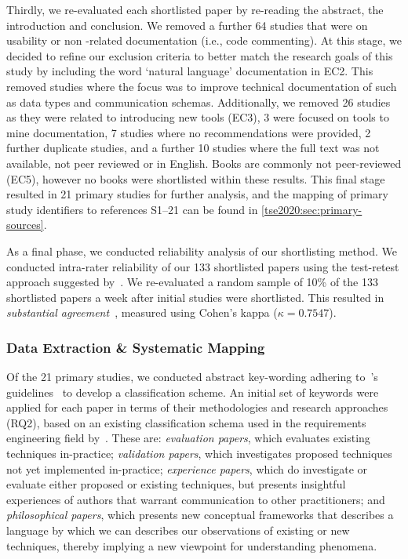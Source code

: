 Thirdly, we re-evaluated each shortlisted paper by re-reading the abstract, the introduction and conclusion. We removed a further 64 studies that were on  usability or non -related  documentation (i.e., code commenting). At this stage, we decided to refine our exclusion criteria to better match the research goals of this study by including the word `natural language' documentation in EC2. This removed studies where the focus was to improve technical documentation of  such as data types and communication schemas. Additionally, we removed 26 studies as they were related to introducing new tools (EC3), 3 were focused on tools to mine  documentation, 7 studies where no recommendations were provided, 2 further duplicate studies, and a further 10 studies where the full text was not available, not peer reviewed or in English. Books are commonly not peer-reviewed (EC5), however no books were shortlisted within these results. This final stage resulted in 21 primary studies for further analysis, and the mapping of primary study identifiers to references S1--21 can be found in \cref{tse2020:sec:primary-sources}.

As a final phase, we conducted reliability analysis of our shortlisting method. We conducted intra-rater reliability of our 133 shortlisted papers using the test-retest approach suggested by~\citet{Kitchenham:2007dd}. We re-evaluated a random sample of 10\% of the 133 shortlisted papers a week after initial studies were shortlisted. This resulted in \textit{substantial agreement}~\citep{Landis:1977kv}, measured using Cohen's kappa ($\kappa=0.7547$).

\subsubsection{Data Extraction \& Systematic Mapping}
\label{tse2020:sec:data-extraction}

Of the 21 primary studies, we conducted abstract key-wording adhering to~\citeauthor{Petersen:2008td}'s guidelines~\citep{Petersen:2008td} to develop a classification scheme.
An initial set of keywords were applied for each paper in terms of their methodologies and research approaches (RQ2), based on an existing classification schema used in the requirements engineering field by~\citet{Wieringa:2006vd}. These are: \textit{evaluation papers}, which evaluates existing techniques in-practice; \textit{validation papers}, which investigates proposed techniques not yet implemented in-practice; \textit{experience papers}, which do investigate or evaluate either proposed or existing techniques, but presents insightful experiences of authors that warrant communication to other practitioners; and \textit{philosophical papers}, which presents new conceptual frameworks that describes a language by which we can describes our observations of existing or new techniques, thereby implying a new viewpoint for understanding phenomena.

